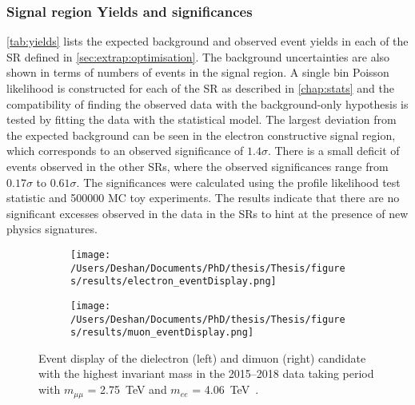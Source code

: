 \subsubsection{Signal region Yields and significances}
\cref{tab:yields} lists the expected background and observed event yields in each of the SR defined in \cref{sec:extrap:optimisation}. The background uncertainties are also shown in terms of numbers of events in the signal region. A single bin Poisson likelihood is constructed for each of the SR as described in \cref{chap:stats} and the compatibility of finding the observed data with the background-only hypothesis is tested by fitting the data with the statistical model. The largest deviation from the expected background can be seen in the electron constructive signal region, which corresponds to an observed significance of $1.4\sigma$. There is a small deficit of events observed in the other SRs, where the observed significances range from $0.17\sigma$ to $0.61\sigma$. The significances were calculated using the profile likelihood test statistic and 500000 MC toy experiments. The results indicate that there are no significant excesses observed in the data in the SRs to hint at the presence of new physics signatures. 

\begin{figure}[!htpb]
    \centering
    \begin{subfigure}[b]{0.49\textwidth}
        \centering
        \texttt{[image: /Users/Deshan/Documents/PhD/thesis/Thesis/figures/results/electron\_eventDisplay.png]}
        \label{fig:eventDisplay1}
    \end{subfigure}
    \begin{subfigure}[b]{0.49\textwidth}
        \centering
        \texttt{[image: /Users/Deshan/Documents/PhD/thesis/Thesis/figures/results/muon\_eventDisplay.png]}
        \label{fig:eventDisplay2}
    \end{subfigure}
    \caption[Event display of the dielectron and dimuon candidate with the highest invariant mass in the 2015--2018 data taking period]{
    Event display of the dielectron (left) and dimuon (right) candidate with the highest invariant mass in the 2015--2018 data taking period with $m_{\mu\mu}$ = \SI{2.75}{\tera\electronvolt} and $m_{ee}$ = \SI{4.06}{\tera\electronvolt}~\cite{Aad:2019fac}.
    }
    \label{fig:eventDisplay}
\end{figure}

